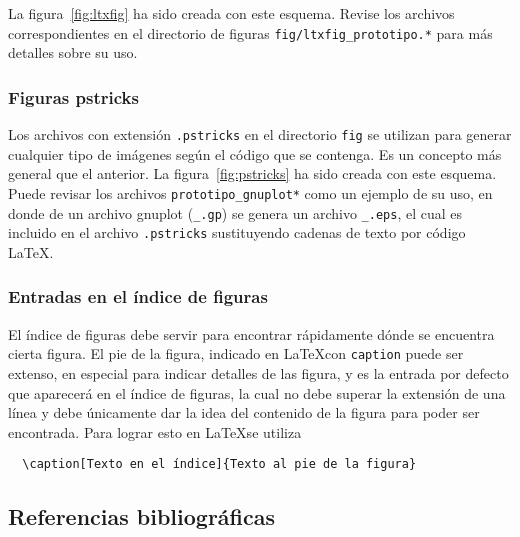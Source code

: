 La figura~\ref{fig:ltxfig} ha sido creada con este esquema.  Revise los
archivos correspondientes en el directorio de figuras
\texttt{fig/ltxfig\_prototipo.*} para más detalles sobre su uso.


\subsubsection{Figuras pstricks}  

Los archivos con extensión \texttt{.pstricks} en el directorio \texttt{fig} se
utilizan para generar cualquier tipo de imágenes según el código que se
contenga.  Es un concepto más general que el anterior.  La
figura~\ref{fig:pstricks} ha sido creada con este esquema.  Puede revisar los
archivos \texttt{prototipo\_gnuplot*} como un ejemplo de su uso, en donde de un
archivo gnuplot (\texttt{\_.gp}) se genera un archivo \texttt{\_.eps}, el cual
es incluido en el archivo \texttt{.pstricks} sustituyendo cadenas de texto por
código LaTeX.


\subsubsection{Entradas en el índice de figuras}

El índice de figuras debe servir para encontrar rápidamente dónde se encuentra
cierta figura.  El pie de la figura, indicado en \LaTeX con \texttt{caption}
puede ser extenso, en especial para indicar detalles de las figura, y es la
entrada por defecto que aparecerá en el índice de figuras, la cual no debe
superar la extensión de una línea y debe únicamente dar la idea del contenido
de la figura para poder ser encontrada.  Para lograr esto en \LaTeX se utiliza
\begin{verbatim}
  \caption[Texto en el índice]{Texto al pie de la figura}
\end{verbatim}

\subsection{Referencias bibliográficas}

